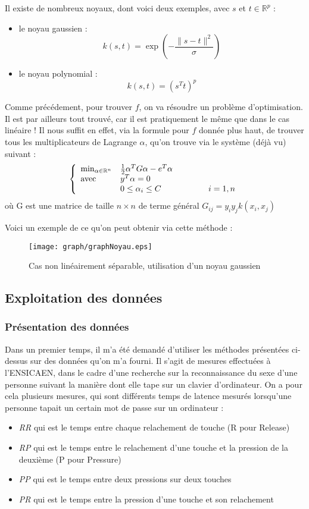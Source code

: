 Il existe de nombreux noyaux, dont voici deux exemples, avec $s$ et $t\in\mathbb{R}^p$ :
\begin{itemize}
	\item le noyau gaussien : \[k(s,t)=\exp\left( -\frac{\|s-t\|^2}{\sigma}\right)\]
	\item le noyau polynomial : \[k(s,t)=(s^Tt)^p\]
\end{itemize}

Comme précédement, pour trouver $f$, on va résoudre un problème d'optimisation. Il est par ailleurs tout trouvé, car il est pratiquement le même que dans le cas linéaire ! Il nous suffit en effet, via la formule pour $f$ donnée plus haut, de trouver tous les multiplicateurs de Lagrange $\alpha$, qu'on trouve via le système (déjà vu) suivant :
	\[\left\{\begin{array}{l l}
	\min_{\alpha\in\mathbb{R}^n} & \frac{1}{2} \alpha^TG\alpha -e^T\alpha\\
	\text{avec } & y^T\alpha=0\\
		& 0\leq \alpha_i\leq C \hspace{2cm} i=1,n
	\end{array}\right.\]
où G est une matrice de taille $n\times n$ de terme général $G_{ij}=y_iy_jk(x_i,x_j)$

Voici un exemple de ce qu'on peut obtenir via cette méthode :
\begin{figure}[!h]
\centering
\texttt{[image: graph/graphNoyau.eps]}
\caption{Cas non linéairement séparable, utilisation d'un noyau gaussien}
\label{figNoy}
\end{figure}

\bigskip

\subsection{Exploitation des données}
\subsubsection{Présentation des données}
Dans un premier temps, il m'a été demandé d'utiliser les méthodes présentées ci-dessus sur des données qu'on m'a fourni. Il s'agit de mesures effectuées à l'ENSICAEN, dans le cadre d'une recherche sur la reconnaissance du sexe d'une personne suivant la manière dont elle tape sur un clavier d'ordinateur. On a pour cela plusieurs mesures, qui sont différents temps de latence mesurés lorsqu'une personne tapait un certain mot de passe sur un ordinateur :
\begin{itemize}
	\item \textit{RR} qui est le temps entre chaque relachement de touche (R pour Release)
	\item \textit{RP} qui est le temps entre le relachement d'une touche et la pression de la deuxième (P pour Pressure)
	\item \textit{PP} qui est le temps entre deux pressions sur deux touches
	\item \textit{PR} qui est le temps entre la pression d'une touche et son relachement
\end{itemize}

